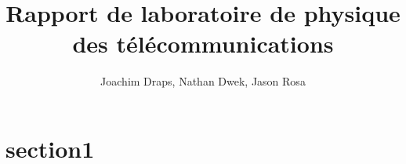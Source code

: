 \documentclass[a4paper, 11pt, frenchb]{article}
\title{Rapport de laboratoire de physique des télécommunications}
\author{Joachim Draps, Nathan Dwek, Jason Rosa}
\begin{document}
\maketitle
\tableofcontents

\section{section1}

\end{document}
